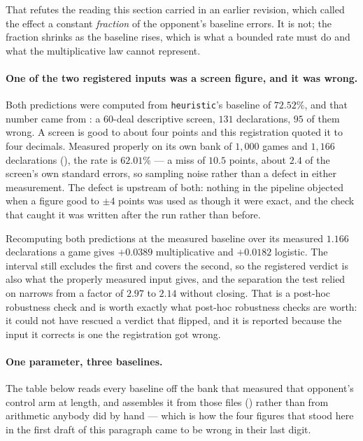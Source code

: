 \documentclass[11pt,letterpaper]{article}
\begin{document}
That refutes the reading this section carried in an earlier revision, which
called the effect a constant \emph{fraction} of the opponent's baseline
errors. It is not; the fraction shrinks as the baseline rises, which is what a
bounded rate must do and what the multiplicative law cannot represent.

\paragraph{One of the two registered inputs was a screen figure, and it was
wrong.} Both predictions were computed from \texttt{heuristic}'s baseline of
$72.52\%$, and that number came from
: a $60$-deal descriptive screen,
$131$ declarations, $95$ of them wrong. A screen is good to about four points
and this registration quoted it to four decimals. Measured properly on its own
bank of $1{,}000$ games and $1{,}166$ declarations
(), the rate is $62.01\%$ --- a miss of
$10.5$ points, about $2.4$ of the screen's own standard errors, so sampling
noise rather than a defect in either measurement. The defect is upstream of
both: nothing in the pipeline objected when a figure good to $\pm4$ points was
used as though it were exact, and the check that caught it was written after
the run rather than before.

Recomputing both predictions at the measured baseline over its measured
$1.166$ declarations a game gives $+0.0389$ multiplicative and $+0.0182$
logistic. The interval still excludes the first and covers the second, so the
registered verdict is also what the properly measured input gives, and the
separation the test relied on narrows from a factor of $2.97$ to $2.14$
without closing. That is a post-hoc robustness check and is worth exactly what
post-hoc robustness checks are worth: it could not have rescued a verdict that
flipped, and it is reported because the input it corrects is one the
registration got wrong.

\paragraph{One parameter, three baselines.} The table below reads every
baseline off the bank that measured that opponent's control arm at length,
and  assembles it from those files
() rather than from arithmetic anybody did
by hand --- which is how the four figures that stood here in the first draft
of this paragraph came to be wrong in their last digit.
\end{document}
